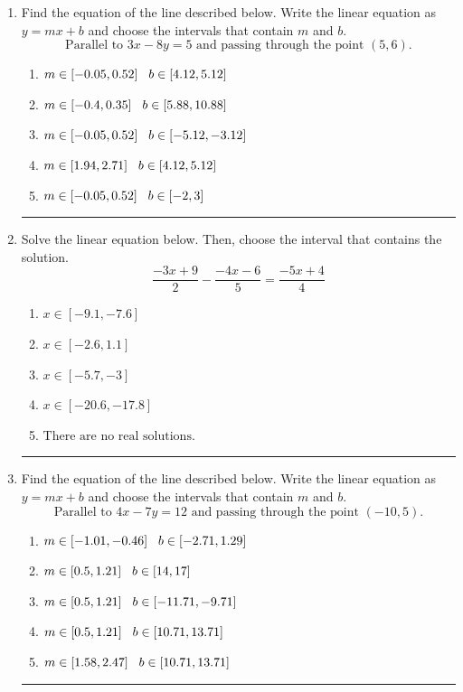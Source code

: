 \documentclass[14pt]{extbook}
\newcommand{\litem}[1]{\item#1\hspace*{-1cm}\rule{\textwidth}{0.4pt}}
\begin{document}
\begin{enumerate}
{\begin{enumerate}[label=\Alph*.]
\end{enumerate} }
\litem{
Find the equation of the line described below. Write the linear equation as $ y=mx+b $ and choose the intervals that contain $m$ and $b$.\[ \text{Parallel to } 3 x - 8 y = 5 \text{ and passing through the point } (5, 6). \]\begin{enumerate}[label=\Alph*.]
\item \( m \in [-0.05, 0.52] \hspace*{3mm} b \in [4.12, 5.12] \)
\item \( m \in [-0.4, 0.35] \hspace*{3mm} b \in [5.88, 10.88] \)
\item \( m \in [-0.05, 0.52] \hspace*{3mm} b \in [-5.12, -3.12] \)
\item \( m \in [1.94, 2.71] \hspace*{3mm} b \in [4.12, 5.12] \)
\item \( m \in [-0.05, 0.52] \hspace*{3mm} b \in [-2, 3] \)

\end{enumerate} }
\litem{
Solve the linear equation below. Then, choose the interval that contains the solution.\[ \frac{-3x + 9}{2} - \frac{-4x -6}{5} = \frac{-5x + 4}{4} \]\begin{enumerate}[label=\Alph*.]
\item \( x \in [-9.1, -7.6] \)
\item \( x \in [-2.6, 1.1] \)
\item \( x \in [-5.7, -3] \)
\item \( x \in [-20.6, -17.8] \)
\item \( \text{There are no real solutions.} \)

\end{enumerate} }
\litem{
Find the equation of the line described below. Write the linear equation as $ y=mx+b $ and choose the intervals that contain $m$ and $b$.\[ \text{Parallel to } 4 x - 7 y = 12 \text{ and passing through the point } (-10, 5). \]\begin{enumerate}[label=\Alph*.]
\item \( m \in [-1.01, -0.46] \hspace*{3mm} b \in [-2.71, 1.29] \)
\item \( m \in [0.5, 1.21] \hspace*{3mm} b \in [14, 17] \)
\item \( m \in [0.5, 1.21] \hspace*{3mm} b \in [-11.71, -9.71] \)
\item \( m \in [0.5, 1.21] \hspace*{3mm} b \in [10.71, 13.71] \)
\item \( m \in [1.58, 2.47] \hspace*{3mm} b \in [10.71, 13.71] \)

\end{enumerate} }
\end{enumerate}
\end{document}

